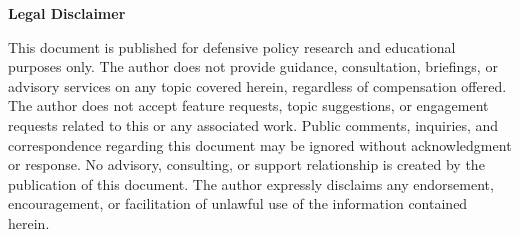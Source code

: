 \documentclass[11pt,letterpaper]{article}
\begin{document}
\begin{center}
\small\textbf{Legal Disclaimer}
\end{center}

\vspace{0.2cm}

\noindent\small This document is published for defensive policy research and educational purposes only. The author does not provide guidance, consultation, briefings, or advisory services on any topic covered herein, regardless of compensation offered. The author does not accept feature requests, topic suggestions, or engagement requests related to this or any associated work. Public comments, inquiries, and correspondence regarding this document may be ignored without acknowledgment or response. No advisory, consulting, or support relationship is created by the publication of this document. The author expressly disclaims any endorsement, encouragement, or facilitation of unlawful use of the information contained herein.
\end{document}
